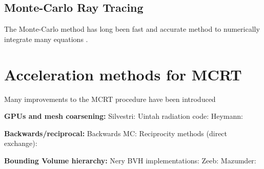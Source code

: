 \subsection{Monte-Carlo Ray Tracing}
The Monte-Carlo method has long been fast and accurate method to numerically integrate many equations \cite{Howell2021TheTransfer}.

\section{Acceleration methods for MCRT}
Many improvements to the MCRT procedure have been introduced

\textbf{GPUs and mesh coarsening:}
Silvestri: \cite{Silvestri2019ASimulation}
Uintah radiation code: \cite{Humphrey2012RadiationSystem,Humphrey2015ATracingb,Humphrey2016RadiativeRefinement,Holmen2017ImprovingTasks,Peterson2018DemonstratingComputations}
Heymann: \cite{Heymann2012GPU-basedAGN}

\textbf{Backwards/reciprocal:}
Backwards MC: \cite{Modest2003BackwardTransfer,Walters1992RigorousMedia}
Reciprocity methods (direct exchange): \cite{Tesse2002RadiativeApproach}

\textbf{Bounding Volume hierarchy: }
Nery BVH implementations: \cite{Nery2011MassivelyTracing,Nery2013ParallelGPGPUs}
Zeeb: \cite{Zeeb2001AnGeometries}
Mazumder: \cite{Mazumder2006MethodsTransport}